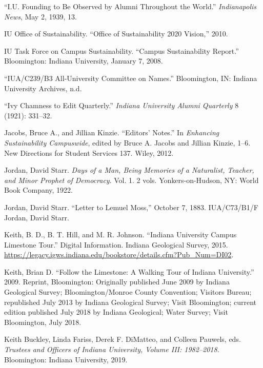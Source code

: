 \documentclass[
  american,
  letterpaper,
]{scrreprt}
\newlength{\cslhangindent}
\newenvironment{CSLReferences}[2] %
 {\begin{list}{}{%
  \setlength{\itemindent}{0pt}
  \setlength{\leftmargin}{0pt}
  \setlength{\parsep}{0pt}
  \ifodd #1
   \setlength{\leftmargin}{\cslhangindent}
   \setlength{\itemindent}{-1\cslhangindent}
  \fi
  \setlength{\itemsep}{#2\baselineskip}}}
 {\end{list}}
\begin{document}
\begin{CSLReferences}{1}{0}
{``{I.U.} Founding to Be Observed by Alumni Throughout the World.''}
\emph{Indianapolis News}, May 2, 1939, 13.

IU Office of Sustainability. {``Office of Sustainability 2020 Vision,''}
2010.

IU Task Force on Campus Sustainability. {``Campus Sustainability
Report.''} Bloomington: Indiana University, January 7, 2008.

{``IUA/C239/B3 All-University Committee on Names.''} Bloomington, IN:
Indiana University Archives, n.d.

{``Ivy Chamness to Edit Quarterly.''} \emph{Indiana University Alumni
Quarterly} 8 (1921): 331--32.

Jacobs, Bruce A., and Jillian Kinzie. {``Editors' Notes.''} In
\emph{Enhancing Sustainability Campuswide}, edited by Bruce A. Jacobs
and Jillian Kinzie, 1--6. New Directions for Student Services 137.
Wiley, 2012.

Jordan, David Starr. \emph{Days of a Man, Being Memories of a
Naturalist, Teacher, and Minor Prophet of Democracy}. Vol. 1. 2 vols.
Yonkers-on-Hudson, NY: World Book Company, 1922.

Jordan, David Starr. {``Letter to Lemuel Moss,''} October 7, 1883.
IUA/C73/B1/F Jordan, David Starr.

Keith, B. D., B. T. Hill, and M. R. Johnson. {``Indiana University
Campus Limestone Tour.''} Digital Information. Indiana Geological
Survey, 2015.
\url{https://legacy.igws.indiana.edu/bookstore/details.cfm?Pub_Num=DI02}.

Keith, Brian D. {``Follow the Limestone: A Walking Tour of Indiana
University.''} 2009. Reprint, Bloomington: Originally published June
2009 by Indiana Geological Survey; Bloomington/Monroe County Convention;
Visitors Bureau; republished July 2013 by Indiana Geological Survey;
Visit Bloomington; current edition published July 2018 by Indiana
Geological; Water Survey; Visit Bloomington, July 2018.

Keith Buckley, Linda Fariss, Derek F. DiMatteo, and Colleen Pauwels,
eds. \emph{Trustees and Officers of Indiana University, Volume III:
1982--2018}. Bloomington: Indiana University, 2019.


\end{CSLReferences}
\end{document}
